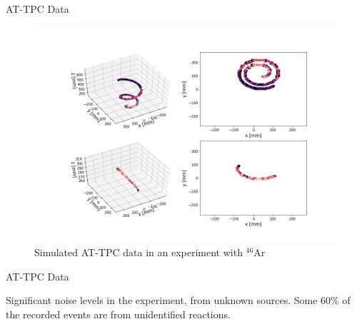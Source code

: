 \documentclass{beamer}
\begin{document}
\begin{frame}[t]{AT-TPC Data}
	\begin{figure}[t]
		\centering
		\includegraphics[width=0.8\linewidth]{../chapters/experimental_background/plots/display_eventssimulated.png}
		\caption{Simulated AT-TPC data in an experiment with ${}^{46}$Ar}
		\label{fig:name}
	\end{figure}
\end{frame}

\begin{frame}[t]{AT-TPC Data}
	\begin{figure}
	\end{figure}
	Significant noise levels in the experiment, from unknown sources. Some $60\%$ of the recorded events are from unidentified reactions.
\end{frame}
\end{document}
